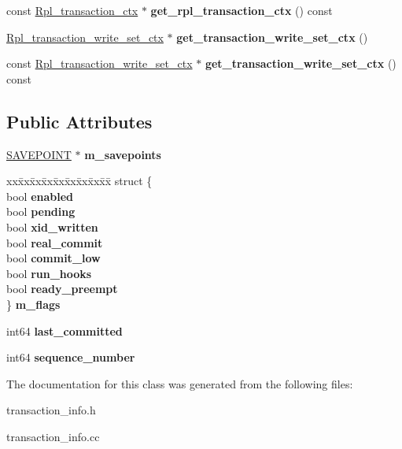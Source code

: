 \begin{DoxyCompactItemize}
\item 
\mbox{\label{classTransaction__ctx_afdc6569161651a581f080c65d229bff0}} 
const \mbox{\hyperlink{classRpl__transaction__ctx}{Rpl\+\_\+transaction\+\_\+ctx}} $\ast$ {\bfseries get\+\_\+rpl\+\_\+transaction\+\_\+ctx} () const
\item 
\mbox{\label{classTransaction__ctx_a03113b1ce383b9543cc211388162a1b4}} 
\mbox{\hyperlink{classRpl__transaction__write__set__ctx}{Rpl\+\_\+transaction\+\_\+write\+\_\+set\+\_\+ctx}} $\ast$ {\bfseries get\+\_\+transaction\+\_\+write\+\_\+set\+\_\+ctx} ()
\item 
\mbox{\label{classTransaction__ctx_ac1fd3223f2bc99cd5eafb74b48342f86}} 
const \mbox{\hyperlink{classRpl__transaction__write__set__ctx}{Rpl\+\_\+transaction\+\_\+write\+\_\+set\+\_\+ctx}} $\ast$ {\bfseries get\+\_\+transaction\+\_\+write\+\_\+set\+\_\+ctx} () const
\end{DoxyCompactItemize}
\subsection*{Public Attributes}
\begin{DoxyCompactItemize}
\item 
\mbox{\label{classTransaction__ctx_a460e25aa0feb325fe2b81be7fd19fc4b}} 
\mbox{\hyperlink{structst__savepoint}{S\+A\+V\+E\+P\+O\+I\+NT}} $\ast$ {\bfseries m\+\_\+savepoints}
\item 
\mbox{\label{classTransaction__ctx_ac095f9abfc9af041bd6e00d7fcea54c7}} 
\begin{tabbing}
xx\=xx\=xx\=xx\=xx\=xx\=xx\=xx\=xx\=\kill
struct \{\\
\>bool {\bfseries enabled}\\
\>bool {\bfseries pending}\\
\>bool {\bfseries xid\_written}\\
\>bool {\bfseries real\_commit}\\
\>bool {\bfseries commit\_low}\\
\>bool {\bfseries run\_hooks}\\
\>bool {\bfseries ready\_preempt}\\
\} {\bfseries m\_flags}\\

\end{tabbing}\item 
\mbox{\label{classTransaction__ctx_a4690f8e351a31fac5d001cd8cf8141c9}} 
int64 {\bfseries last\+\_\+committed}
\item 
\mbox{\label{classTransaction__ctx_a71d2819e168da62b96f2c5188b979fd0}} 
int64 {\bfseries sequence\+\_\+number}
\end{DoxyCompactItemize}


The documentation for this class was generated from the following files\+:\begin{DoxyCompactItemize}
\item 
transaction\+\_\+info.\+h\item 
transaction\+\_\+info.\+cc\end{DoxyCompactItemize}
